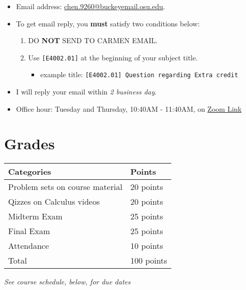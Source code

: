 \documentclass[12pt]{article}
\begin{document}
\begin{itemize}
    \item Email address: \href{chen.9260@buckeyemail.osu.edu}{chen.9260@buckeyemail.osu.edu}.
    \item To get email reply, you \textbf{must} satisfy two conditions below:
    \begin{enumerate}
        \item DO \textbf{NOT} SEND TO CARMEN EMAIL.
        \item Use \texttt{[E4002.01]} at the beginning of your subject title.
        \begin{itemize}
            \item example title: \texttt{[E4002.01] Question regarding Extra credit}
        \end{itemize}
    \end{enumerate}
    \item I will reply your email within \textit{2 business day}.
    \item Office hour: Tuesday and Thursday, 10:40AM - 11:40AM, on \href{https://osu.zoom.us/j/95172261996?pwd=bHVuRlU5dHlmSUx5STcycDBkOVdpZz09}{Zoom Link}
\end{itemize}

\newpage

\section*{Grades}

\newlength\q
\setlength{}
\begin{tabular}{|p{\q}|p{\q}|}
    \hline
    Categories  & Points \\
    \hline
    \hline
    Problem sets on course material   & 20 points \\
    \hline
    Qizzes on Calculus videos & 20 points \\
    \hline
    Midterm Exam & 25 points \\
    \hline
    Final Exam & 25 points \\
    \hline
    Attendance & 10 points \\
    \hline
    Total & 100 points \\
    \hline
\end{tabular}
\textit{See course schedule, below, for due dates}
\end{document}
